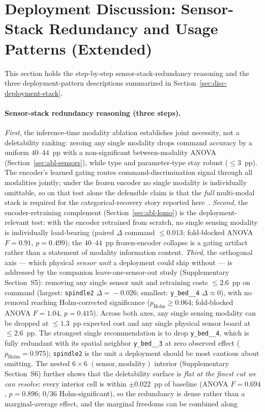 \documentclass[11pt,a4paper]{article}
\begin{document}
\section{Deployment Discussion: Sensor-Stack Redundancy and Usage Patterns (Extended)}
\label{app:deployment-detail}

This section holds the step-by-step sensor-stack-redundancy reasoning and the
three deployment-pattern descriptions summarized in
Section~\ref{sec:disc-deployment-stack}.

\paragraph{Sensor-stack redundancy reasoning (three steps).} \emph{First}, the inference-time modality ablation establishes joint necessity, not a deletability ranking: zeroing any single modality drops command accuracy by a uniform $40$--$44$~pp with a non-significant between-modality ANOVA (Section~\ref{sec:abl-sensors}), while type and parameter-type stay robust ($\le\!3$~pp). The encoder's learned gating routes command-discrimination signal through all modalities jointly; under the frozen encoder no single modality is individually omittable, so on that test alone the defensible claim is that the \emph{full} multi-modal stack is required for the categorical-recovery story reported here~\cite{kimmell2025cnc,nist2023sp80082,nist2024fmnet}. \emph{Second}, the encoder-retraining complement (Section~\ref{sec:abl-lomo}) is the deployment-relevant test: with the encoder retrained from scratch, no single sensing modality is individually load-bearing (paired $\Delta$ command $\le\!0.013$; fold-blocked ANOVA $F\!=\!0.91$, $p\!=\!0.499$); the $40$--$44$~pp frozen-encoder collapse is a gating artifact rather than a statement of modality information content. \emph{Third}, the orthogonal axis --- which physical \emph{sensor unit} a deployment could ship without --- is addressed by the companion leave-one-sensor-out study (Supplementary Section~S5): removing any single sensor unit and retraining costs $\le\!2.6$~pp on command (largest: \texttt{spindle2} $\Delta\!=\!-0.026$; smallest: \texttt{y\_bed\_\_4} $\Delta\!\approx\!0$), with no removal reaching Holm-corrected significance ($p_{\text{Holm}}\!\ge\!0.064$; fold-blocked ANOVA $F\!=\!1.04$, $p\!=\!0.415$). Across both axes, any single sensing modality can be dropped at $\le\!1.3$~pp expected cost and any single physical sensor board at $\le\!2.6$~pp. The strongest single recommendation is to drop \texttt{y\_bed\_\_4}, which is fully redundant with its spatial neighbor \texttt{y\_bed\_\_3} at zero observed effect ($p_{\text{Holm}}\!=\!0.975$); \texttt{spindle2} is the unit a deployment should be most cautious about omitting. The nested $6\!\times\!6$ $(\text{sensor},\text{modality})$ interior (Supplementary Section~S6) further shows that the deletability surface is \emph{flat at the finest cut we can resolve}: every interior cell is within $\pm 0.022$~pp of baseline (ANOVA $F\!=\!0.694$, $p\!=\!0.896$; $0/36$ Holm-significant), so the redundancy is dense rather than a marginal-average effect, and the marginal freedoms can be combined along 
\end{document}
